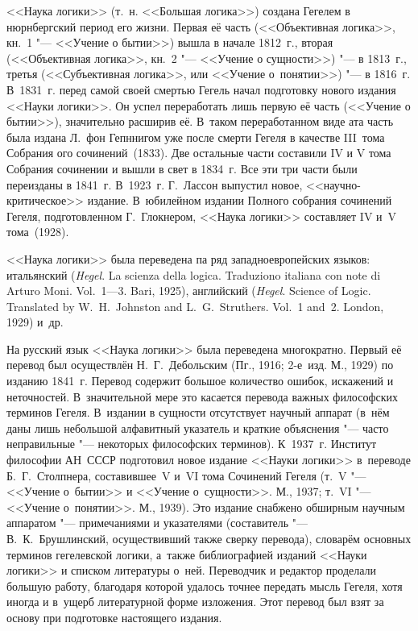<<Наука логики>> (т.~н. <<Большая логика>>) создана Гегелем в нюрнбергский
период его жизни. Первая её часть (<<Объективная логика>>, кн.~1 "--- <<Учение
о бытии>>) вышла в начале 1812~г., вторая (<<Объективная логика>>, кн.~2 "---
<<Учение о сущности>>) "--- в 1813~г., третья (<<Субъективная логика>>, или
<<Учение о~понятии>>) "--- в 1816~г. В~1831~г. перед самой своей смертью Гегель
начал подготовку нового издания <<Науки логики>>. Он успел переработать лишь
первую её часть (<<Учение о бытии>>), значительно расширив её. В~таком
переработанном виде ата часть была издана Л.~фон Гепннигом уже после смерти
Гегеля в качестве III~тома Собрания ого сочинений~(1833). Две остальные части
составили IV и V тома Собрания сочинении и вышли в свет в 1834~г. Все эти три
части были переизданы в 1841~г. В~1923~г. Г.~Лассон выпустил новое,
<<научно-критическое>> издание. В~юбилейном издании Полного собрания сочинений
Гегеля, подготовленном Г.~Глокнером, <<Наука логики>>
составляет IV и~V тома~(1928).

<<Наука логики>> была переведена па ряд западноевропейских языков: итальянский
({\em Hegel}. La scienza della logica. Traduziono italiana con note di Arturo
Moni. Vol.~1---3. Bari, 1925), английский ({\em Hegel}. Science of Logic.
Translated by W.~H.~Johnston and L.~G.~Struthers. Vol.~1 and~2. London, 1929)
и~др.

На русский язык <<Наука логики>> была переведена многократно. Первый её перевод
был осуществлён Н.~Г.~Дебольским (Пг., 1916; 2-е~изд. М., 1929) по изданию
1841~г. Перевод содержит большое количество ошибок, искажений и неточностей.
В~значительной мере это касается перевода важных философских терминов Гегеля.
В~издании в сущности отсутствует научный аппарат (в~нём даны лишь небольшой
алфавитный указатель и краткие объяснения "--- часто неправильные "---
некоторых философских терминов). К~1937~г. Институт философии АН~СССР
подготовил новое издание <<Науки логики>> в~переводе Б.~Г.~Столпнера,
составившее~V и~VI тома Сочинений Гегеля (т.~V "--- <<Учение о~бытии>> и
<<Учение о~сущности>>. М., 1937; т.~VI "--- <<Учение о~понятии>>. М., 1939).
Это издание снабжено обширным научным аппаратом "--- примечаниями и указателями
(составитель "--- В.~К.~Брушлинский, осуществивший также сверку перевода),
словарём основных терминов гегелевской логики, а~также библиографией изданий
<<Науки логики>> и списком литературы о~ней. Переводчик и редактор проделали
большую работу, благодаря которой удалось точнее передать мысль Гегеля, хотя
иногда и в~ущерб литературной форме изложения. Этот перевод был взят за основу
при подготовке настоящего издания.

\bigskip

\begin{center}
~~~~~~
\end{center}

\bigskip

\begin{footnotesize}
\printpagenotes
\end{footnotesize}
